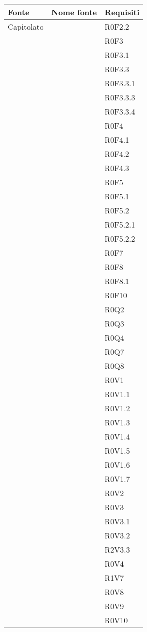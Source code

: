 \documentclass[AnalisiDeiRequisiti.tex]{subfiles}
\begin{document}
\label{table:Tabella di tracciamento fonti-requisiti}


\renewcommand*{\arraystretch}{1.2}
\begin{longtable}[H]{p{2cm}p{5cm}p{5cm}}
	\rowcolor{CHeader} 
	\color{CHeaderText} \textbf{Fonte} & \color{CHeaderText} \textbf{Nome fonte} & \color{CHeaderText} \textbf{Requisiti} \\  
	\endhead
	Capitolato & & R0F2.2 \\
	& & R0F3 \\
	& & R0F3.1 \\
	& & R0F3.3 \\
	& & R0F3.3.1 \\
	& & R0F3.3.3 \\
	& & R0F3.3.4 \\
	& & R0F4 \\
	& & R0F4.1 \\
	& & R0F4.2 \\
	& & R0F4.3 \\
	& & R0F5 \\
	& & R0F5.1 \\
	& & R0F5.2 \\
	& & R0F5.2.1 \\
	& & R0F5.2.2 \\
	& & R0F7 \\
	& & R0F8 \\
	& & R0F8.1 \\
	& & R0F10 \\
	& & R0Q2 \\
	& & R0Q3 \\
	& & R0Q4 \\
	& & R0Q7 \\
	& & R0Q8 \\
	& & R0V1 \\
	& & R0V1.1 \\
	& & R0V1.2 \\
	& & R0V1.3 \\
	& & R0V1.4 \\
	& & R0V1.5 \\
	& & R0V1.6 \\
	& & R0V1.7 \\
	& & R0V2 \\
	& & R0V3 \\
	& & R0V3.1 \\
	& & R0V3.2 \\
	& & R2V3.3 \\
	& & R0V4 \\
	& & R1V7 \\
	& & R0V8 \\
	& & R0V9 \\
	& & R0V10 \\  
	

\end{longtable}
\end{document}
